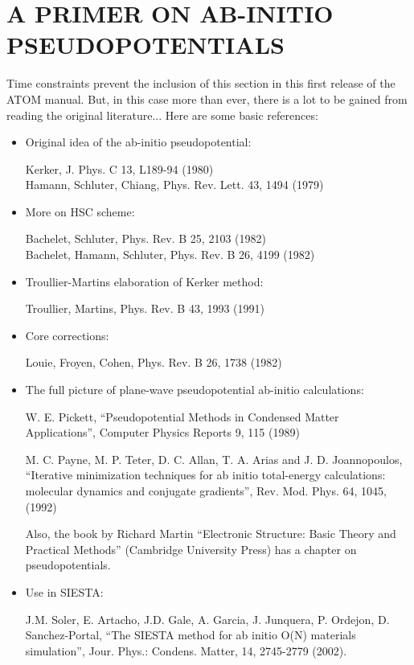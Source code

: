 \documentclass[11pt]{article}
\begin{document}
\section{A PRIMER ON AB-INITIO PSEUDOPOTENTIALS}

Time constraints prevent the inclusion of this section in this first
release of the {\sc ATOM} manual. But, in this case more than ever,
there is a lot to be gained from reading the original literature...
Here are some basic references:

\begin{itemize}
\item Original idea of the ab-initio pseudopotential:

Kerker, J. Phys. C 13, L189-94 (1980)\\
Hamann, Schluter, Chiang, Phys. Rev. Lett. 43, 1494 (1979)

\item More on HSC scheme:

Bachelet, Schluter, Phys. Rev. B 25, 2103 (1982)\\
Bachelet, Hamann, Schluter, Phys. Rev. B 26, 4199 (1982)

\item Troullier-Martins elaboration of Kerker method:

Troullier, Martins, Phys. Rev. B 43, 1993 (1991)\\

\item Core corrections:

Louie, Froyen, Cohen, Phys. Rev. B 26, 1738 (1982)

\item The full picture of plane-wave pseudopotential ab-initio calculations:

W. E. Pickett, ``Pseudopotential Methods in Condensed Matter
Applications'', Computer Physics Reports 9, 115 (1989)

M. C. Payne, M. P. Teter, D. C. Allan, T. A. Arias and
J. D. Joannopoulos, ``Iterative minimization techniques for ab initio
total-energy calculations: molecular dynamics and conjugate
gradients'', Rev. Mod. Phys. 64, 1045, (1992)

Also, the book by Richard Martin
``Electronic Structure: Basic Theory and Practical Methods''
(Cambridge University Press) has a chapter on pseudopotentials.

\item Use in {\sc SIESTA}:

J.M. Soler, E. Artacho, J.D. Gale, A. Garcia, J. Junquera, P. Ordejon,
D. Sanchez-Portal, ``The SIESTA method for ab initio O(N)
materials simulation'', Jour. Phys.: Condens. Matter, 14, 2745-2779
(2002).

\end{itemize}
\end{document}

